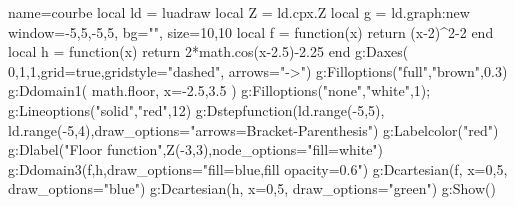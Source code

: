 \begin{luadraw}{name=courbe}
local ld = luadraw
local Z = ld.cpx.Z
local g = ld.graph:new{ window={-5,5,-5,5}, bg="", size={10,10} }
local f = function(x) return (x-2)^2-2 end
local h = function(x) return 2*math.cos(x-2.5)-2.25 end
g:Daxes( {0,1,1},{grid=true,gridstyle="dashed", arrows="->"})
g:Filloptions("full","brown",0.3)
g:Ddomain1( math.floor, { x={-2.5,3.5} })
g:Filloptions("none","white",1); g:Lineoptions("solid","red",12)
g:Dstepfunction({ld.range(-5,5), ld.range(-5,4)},{draw_options="arrows={Bracket-Parenthesis}"})
g:Labelcolor("red")
g:Dlabel("Floor function",Z(-3,3),{node_options="fill=white"})
g:Ddomain3(f,h,{draw_options="fill=blue,fill opacity=0.6"})
g:Dcartesian(f, {x={0,5}, draw_options="blue"})
g:Dcartesian(h, {x={0,5}, draw_options="green"})
g:Show()
\end{luadraw}
